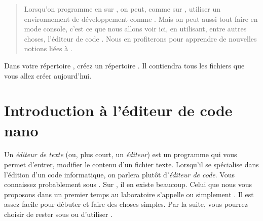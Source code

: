 \documentclass[a4paper,11pt]{style-esi/td}
\begin{document}
\entete
\titre
{}
\lastedit

\bigskip
\begin{abstract}
    Lorsqu'on programme en  sur ,
    on peut, comme sur ,
    utiliser un environnement de développement comme .
    Mais on peut aussi tout faire en mode console, 
    c'est ce que nous allons voir ici, en utilisant, entre autres choses,
    l'éditeur de code .
    Nous en profiterons pour apprendre de nouvelles notions liées à .
\end{abstract}

\bigskip
\tableofcontents

\vfill
\begin{infobox}
    Dans votre répertoire , 
    créez un répertoire . 
    Il contiendra tous les fichiers que vous allez créer aujourd'hui. 
\end{infobox}
\vfill

\section{Introduction à l'éditeur de code nano}

	Un \emph{éditeur de texte} (ou, plus court, un \emph{éditeur}) 
	est un programme qui vous permet d'entrer, modifier
	le contenu d'un fichier texte.
	Lorsqu'il se spécialise dans l'édition d'un code informatique,
	on parlera plutôt d'\emph{éditeur de code}.
	Vous connaissez probablement  sous . 
	Sur , il en existe beaucoup. 
	Celui que nous vous proposons dans un premier temps au laboratoire 
	s'appelle  ou simplement . 
	Il est assez facile pour débuter et faire des choses simples. 
	Par la suite, vous pourrez choisir de rester sous  
	ou d'utiliser .
\end{document}
